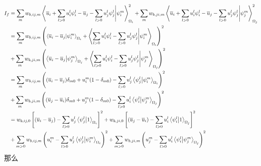 \documentclass[UTF8,zihao=5]{ctexart} %
\newcommand*{\mean}[1]{\overline{#1}}
\begin{document}
$$
    \begin{aligned}
        I_f & =
        \sum_{m}
        {
            w_{b,ij,m}
            \innerproduct{\mean{u}_i + \sum_{l>0}{u_i^l\psi_i^l} - \mean{u}_j - \sum_{l>0}{u_j^l\psi_j^l} }{\psi_i^m}_{\Omega_i}^2
        }
        +
        \sum_{m}
        {
            w_{b,ji,m}
            \innerproduct{\mean{u}_i + \sum_{l>0}{u_i^l\psi_i^l} - \mean{u}_j - \sum_{l>0}{u_j^l\psi_j^l} }{\psi_j^m}_{\Omega_j}^2
        }          \\
            & =
        \sum_{m}
        {w_{b,ij,m}\left(
            \innerproduct{\mean{u}_i - \mean{u}_j}{\psi_i^m}_{\Omega_i}
            +
            \innerproduct{\sum_{l>0}{u_i^l\psi_i^l} - \sum_{l>0}{u_j^l\psi_j^l} }{\psi_i^m}_{\Omega_i}
            \right)^2}
        \\
            & +
        \sum_{m}
        {w_{b,ji,m}\left(
            \innerproduct{\mean{u}_i - \mean{u}_j}{\psi_j^m}_{\Omega_j}
            +
            \innerproduct{\sum_{l>0}{u_i^l\psi_i^l} - \sum_{l>0}{u_j^l\psi_j^l} }{\psi_j^m}_{\Omega_j}
        \right)^2} \\
            & =
        \sum_{m}
        {w_{b,ij,m}\left(
            (\mean{u}_i - \mean{u}_j)\delta_{m0}
            +
            u_i^m(1-\delta_{m0})
            - \sum_{l>0}u_j^l\innerproduct{\psi_j^l}{\psi_i^m}_{\Omega_i}
            \right)^2}
        \\
            & +
        \sum_{m}
        {w_{b,ji,m}\left(
            (\mean{u}_j - \mean{u}_i)\delta_{m0}
            +
            u_j^m(1-\delta_{m0})
            - \sum_{l>0}u_i^l\innerproduct{\psi_i^l}{\psi_j^m}_{\Omega_j}
        \right)^2} \\
            & =
        w_{b,ij,0}\left[
            (\mean{u}_i - \mean{u}_j)
            - \sum_{l>0}u_j^l\innerproduct{\psi_j^l}{1}_{\Omega_i}
            \right]^2
        +
        w_{b,ji,0}\left[
            (\mean{u}_j - \mean{u}_i)
            - \sum_{l>0}u_i^l\innerproduct{\psi_i^l}{1}_{\Omega_j}
        \right]^2  \\
            & +
        \sum_{m>0}
        {w_{b,ij,m}\left(
            u_i^m
            - \sum_{l>0}u_j^l\innerproduct{\psi_j^l}{\psi_i^m}_{\Omega_i}
            \right)^2}
        +
        \sum_{m>0}
        {w_{b,ji,m}\left(
            u_j^m
            - \sum_{l>0}u_i^l\innerproduct{\psi_i^l}{\psi_j^m}_{\Omega_j}
        \right)^2} \\
    \end{aligned}
$$
那么
\end{document}
